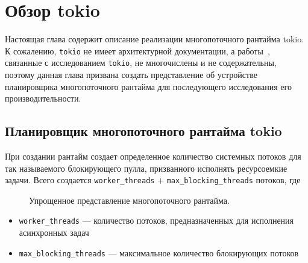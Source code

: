 
\section{Обзор tokio}

Настоящая глава содержит описание реализации многопоточного рантайма tokio. К сожалению, \verb|tokio| не имеет архитектурной документации, а работы~\cite{cringeTokioIOUring}, связанные с исследованием \verb|tokio|, не многочислены и не содержательны, поэтому данная глава призвана создать представление об устройстве планировщика многопоточного рантайма для последующего исследования его производительности.

\subsection{Планировщик многопоточного рантайма tokio}

При создании рантайм создает определенное количество системных потоков для так называемого блокирующего пулла, призванного исполнять ресурсоемкие задачи. Всего создается \verb|worker_threads| + \verb|max_blocking_threads| потоков, где

\begin{figure}[H]
    \begin{center}
    \end{center}

    \caption{Упрощенное представление многопоточного рантайма.}
    \label{fig:tokio:arch}
\end{figure}

\begin{itemize}
    \item \verb|worker_threads| --- количество потоков, предназначенных для исполнения асинхронных задач
    \item \verb|max_blocking_threads| --- максимальное количество блокирующих потоков
\end{itemize}

